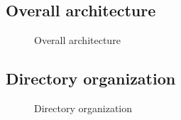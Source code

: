 \documentclass[conference]{IEEEtran}
\begin{document}
\subsection{Overall architecture}
\begin{figure}[htbp]
\begin{center}
    \caption{Overall architecture} 
\end{center}
\end{figure}
\subsection{Directory organization}
\begin{figure}[htbp]
\begin{center}
    \caption{Directory organization} 
\end{center}
\end{figure}
\quad
 \\\\\\\\\\\\\\\\\\\\\\\\\\\\\\\\\\\\\\\\\\\\\\\\\\\\\\\\\\\\\\\\\\\\\\\\\\\\\\\\\\\\\\\\\\\\\\\\\
\end{document}
